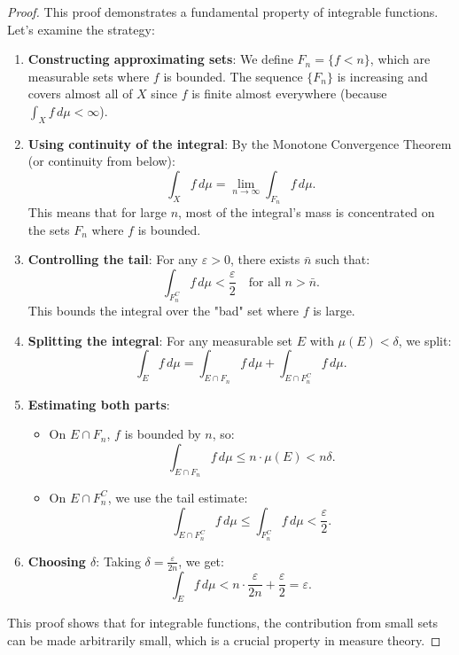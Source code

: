 \begin{proof}
This proof demonstrates a fundamental property of integrable functions. Let's examine the strategy:

\begin{enumerate}
\item \textbf{Constructing approximating sets}: We define $F_n = \{f < n\}$, which are measurable sets where $f$ is bounded. The sequence $\{F_n\}$ is increasing and covers almost all of $X$ since $f$ is finite almost everywhere (because $\int_X f \, d\mu < \infty$).

\item \textbf{Using continuity of the integral}: By the Monotone Convergence Theorem (or continuity from below):
\[
\int_X f \, d\mu = \lim_{n \to \infty} \int_{F_n} f \, d\mu.
\]
This means that for large $n$, most of the integral's mass is concentrated on the sets $F_n$ where $f$ is bounded.

\item \textbf{Controlling the tail}: For any $\varepsilon > 0$, there exists $\bar{n}$ such that:
\[
\int_{F_n^C} f \, d\mu < \frac{\varepsilon}{2} \quad \text{for all } n > \bar{n}.
\]
This bounds the integral over the "bad" set where $f$ is large.

\item \textbf{Splitting the integral}: For any measurable set $E$ with $\mu(E) < \delta$, we split:
\[
\int_E f \, d\mu = \int_{E \cap F_n} f \, d\mu + \int_{E \cap F_n^C} f \, d\mu.
\]

\item \textbf{Estimating both parts}:
\begin{itemize}
\item On $E \cap F_n$, $f$ is bounded by $n$, so:
\[
\int_{E \cap F_n} f \, d\mu \leq n \cdot \mu(E) < n\delta.
\]
\item On $E \cap F_n^C$, we use the tail estimate:
\[
\int_{E \cap F_n^C} f \, d\mu \leq \int_{F_n^C} f \, d\mu < \frac{\varepsilon}{2}.
\]
\end{itemize}

\item \textbf{Choosing $\delta$}: Taking $\delta = \frac{\varepsilon}{2n}$, we get:
\[
\int_E f \, d\mu < n \cdot \frac{\varepsilon}{2n} + \frac{\varepsilon}{2} = \varepsilon.
\]
\end{enumerate}

This proof shows that for integrable functions, the contribution from small sets can be made arbitrarily small, which is a crucial property in measure theory.
\end{proof}


